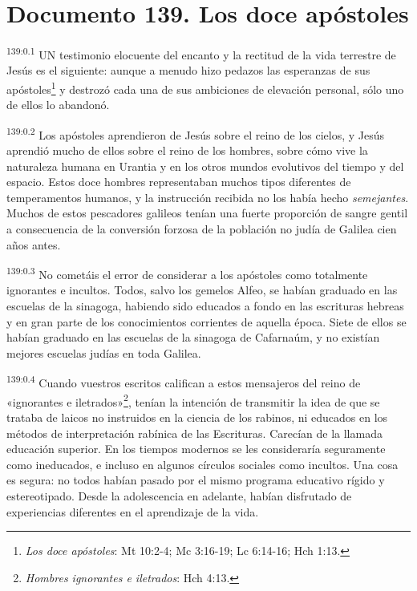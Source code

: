 \chapter{Documento 139. Los doce apóstoles}
\par
\textsuperscript{139:0.1} UN testimonio elocuente del encanto y la rectitud de la vida terrestre de Jesús es el siguiente: aunque a menudo hizo pedazos las esperanzas de sus apóstoles\footnote{\textit{Los doce apóstoles}: Mt 10:2-4; Mc 3:16-19; Lc 6:14-16; Hch 1:13.} y destrozó cada una de sus ambiciones de elevación personal, sólo uno de ellos lo abandonó.

\par
\textsuperscript{139:0.2} Los apóstoles aprendieron de Jesús sobre el reino de los cielos, y Jesús aprendió mucho de ellos sobre el reino de los hombres, sobre cómo vive la naturaleza humana en Urantia y en los otros mundos evolutivos del tiempo y del espacio. Estos doce hombres representaban muchos tipos diferentes de temperamentos humanos, y la instrucción recibida no los había hecho \textit{semejantes}. Muchos de estos pescadores galileos tenían una fuerte proporción de sangre gentil a consecuencia de la conversión forzosa de la población no judía de Galilea cien años antes.

\par
\textsuperscript{139:0.3} No cometáis el error de considerar a los apóstoles como totalmente ignorantes e incultos. Todos, salvo los gemelos Alfeo, se habían graduado en las escuelas de la sinagoga, habiendo sido educados a fondo en las escrituras hebreas y en gran parte de los conocimientos corrientes de aquella época. Siete de ellos se habían graduado en las escuelas de la sinagoga de Cafarnaúm, y no existían mejores escuelas judías en toda Galilea.

\par
\textsuperscript{139:0.4} Cuando vuestros escritos califican a estos mensajeros del reino de «ignorantes e iletrados»\footnote{\textit{Hombres ignorantes e iletrados}: Hch 4:13.}, tenían la intención de transmitir la idea de que se trataba de laicos no instruidos en la ciencia de los rabinos, ni educados en los métodos de interpretación rabínica de las Escrituras. Carecían de la llamada educación superior. En los tiempos modernos se les consideraría seguramente como ineducados, e incluso en algunos círculos sociales como incultos. Una cosa es segura: no todos habían pasado por el mismo programa educativo rígido y estereotipado. Desde la adolescencia en adelante, habían disfrutado de experiencias diferentes en el aprendizaje de la vida.

